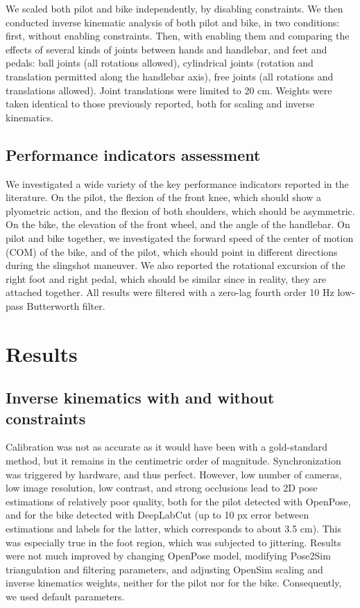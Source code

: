 We scaled both pilot and bike independently, by disabling constraints. We then conducted inverse kinematic analysis of both pilot and bike, in two conditions: first, without enabling constraints. Then, with enabling them and comparing the effects of several kinds of joints between hands and handlebar, and feet and pedals: ball joints (all rotations allowed), cylindrical joints (rotation and translation permitted along the handlebar axis), free joints (all rotations and translations allowed). Joint translations were limited to 20 cm. Weights were taken identical to those previously reported, both for scaling and inverse kinematics. 


\subsection{Performance indicators assessment}
We investigated a wide variety of the key performance indicators reported in the literature. On the pilot, the flexion of the front knee, which should show a plyometric action, and the flexion of both shoulders, which should be asymmetric. On the bike, the elevation of the front wheel, and the angle of the handlebar. On pilot and bike together, we investigated the forward speed of the center of motion (COM) of the bike, and of the pilot, which should point in different directions during the slingshot maneuver. We also reported the rotational excursion of the right foot and right pedal, which should be similar since in reality, they are attached together. All results were filtered with a zero-lag fourth order 10 Hz low-pass Butterworth filter.


\section{Results}
\subsection{Inverse kinematics with and without constraints}
Calibration was not as accurate as it would have been with a gold-standard method, but it remains in the centimetric order of magnitude. Synchronization was triggered by hardware, and thus perfect. However, low number of cameras, low image resolution, low contrast, and strong occlusions lead to 2D pose estimations of relatively poor quality, both for the pilot detected with OpenPose, and for the bike detected with DeepLabCut (up to 10 px error between estimations and labels for the latter, which corresponds to about 3.5 cm). This was especially true in the foot region, which was subjected to jittering. Results were not much improved by changing OpenPose model, modifying Pose2Sim triangulation and filtering parameters, and adjusting OpenSim scaling and inverse kinematics weights, neither for the pilot nor for the bike. Consequently, we used default parameters. 

